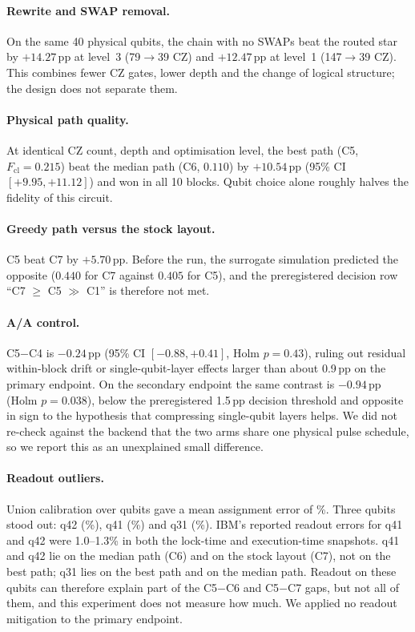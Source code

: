 \documentclass[10pt,twocolumn]{article}
\begin{document}
\paragraph{Rewrite and SWAP removal.} On the same 40 physical qubits, the chain with no SWAPs beat
the routed star by $+14.27$\,pp at level~3 (79$\to$39 CZ) and $+12.47$\,pp at level~1 (147$\to$39 CZ).
This combines fewer CZ gates, lower depth and the change of logical structure; the design does not
separate them.

\paragraph{Physical path quality.} At identical CZ count, depth and optimisation level, the best path
(C5, $F_{\mathrm{cl}}=0.215$) beat the median path (C6, $0.110$) by $+10.54$\,pp
(95\% CI $[+9.95,+11.12]$) and won in all 10 blocks. Qubit choice alone roughly halves the fidelity of
this circuit.

\paragraph{Greedy path versus the stock layout.} C5 beat C7 by $+5.70$\,pp. Before the run, the
surrogate simulation predicted the opposite ($0.440$ for C7 against $0.405$ for C5), and the
preregistered decision row ``C7 $\ge$ C5 $\gg$ C1'' is therefore not met.

\paragraph{A/A control.} C5$-$C4 is $-0.24$\,pp (95\% CI $[-0.88,+0.41]$, Holm $p=0.43$), ruling out
residual within-block drift or single-qubit-layer effects larger than about 0.9\,pp on the primary
endpoint. On the secondary endpoint the same contrast is $-0.94$\,pp (Holm $p=0.038$), below the
preregistered 1.5\,pp decision threshold and opposite in sign to the hypothesis that compressing
single-qubit layers helps. We did not re-check against the backend that the two arms share one
physical pulse schedule, so we report this as an unexplained small difference.

\paragraph{Readout outliers.} Union calibration over \UnionQubits{} qubits gave a mean assignment
error of \UnionReadout\%. Three qubits stood out: q42 (\QFortyTwo\%), q41 (\QFortyOne\%) and q31
(\QThirtyOne\%). IBM's reported readout errors for q41 and q42 were 1.0--1.3\% in both the lock-time
and execution-time snapshots. q41 and q42 lie on the median path (C6) and on the stock layout (C7),
not on the best path; q31 lies on the best path and on the median path. Readout on these qubits can
therefore explain part of the C5$-$C6 and C5$-$C7 gaps, but not all of them, and this experiment does
not measure how much. We applied no readout mitigation to the primary endpoint.
\end{document}
